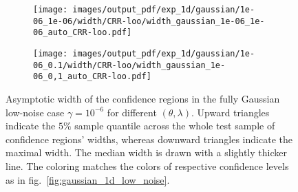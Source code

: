 \documentclass[a4paper,14pt]{extarticle}
\begin{document}
\begin{figure}
\begin{subfigure}[b]{0.25\linewidth}
    \caption{} \label{fig:gaussian_1d_low_noise_width_c2}
  \end{subfigure}%
  \begin{subfigure}[b]{0.25\linewidth}
    \texttt{[image: images/output\_pdf/exp\_1d/gaussian/1e-06\_1e-06/width/CRR-loo/width\_gaussian\_1e-06\_1e-06\_auto\_CRR-loo.pdf]}
    \caption{} \label{fig:gaussian_1d_low_noise_width_c3}
  \end{subfigure}%
  \begin{subfigure}[b]{0.25\linewidth}
    \texttt{[image: images/output\_pdf/exp\_1d/gaussian/1e-06\_0.1/width/CRR-loo/width\_gaussian\_1e-06\_0,1\_auto\_CRR-loo.pdf]}
    \caption{} \label{fig:gaussian_1d_low_noise_width_c4}
  \end{subfigure}%
  \caption{Asymptotic width of the confidence regions in the fully Gaussian low-noise case
  $\gamma=10^{-6}$ for different $(\theta, \lambda)$. Upward triangles indicate the
  $5\%$ sample quantile across the whole test sample of confidence regions' widths,
  whereas downward triangles indicate the maximal width. The median width is drawn
  with a slightly thicker line. The coloring matches the colors of respective confidence
  levels as in fig.~\ref{fig:gaussian_1d_low_noise}.}
  \label{fig:gaussian_1d_low_noise_width}
\end{figure}
\end{document}
